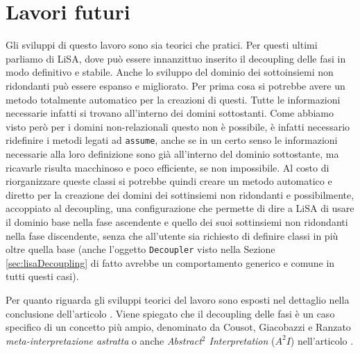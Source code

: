 \section{Lavori futuri}
Gli sviluppi di questo lavoro sono sia teorici che pratici. Per questi ultimi parliamo di LiSA, dove può essere innanzittuo inserito il decoupling delle fasi in modo definitivo e stabile. Anche lo sviluppo del dominio dei sottoinsiemi non ridondanti può essere espanso e migliorato. Per prima cosa si potrebbe avere un metodo totalmente automatico per la creazioni di questi. Tutte le informazioni necessarie infatti si trovano all'interno dei domini sottostanti. Come abbiamo visto però per i domini non-relazionali questo non è possibile, è infatti necessario ridefinire i metodi legati ad \texttt{assume}, anche se in un certo senso le informazioni necessarie alla loro definizione sono già all'interno del dominio sottostante, ma ricavarle risulta macchinoso e poco efficiente, se non impossibile. Al costo di riorganizzare queste classi si potrebbe quindi creare un metodo automatico e diretto per la creazione dei domini dei sottinsiemi non ridondanti e possibilmente, accoppiato al decoupling, una configurazione che permette di dire a LiSA di usare il dominio base nella fase ascendente e quello dei suoi sottinsiemi non ridondanti nella fase discendente, senza che all'utente sia richiesto di definire classi in più oltre quella base (anche l'oggetto \texttt{Decoupler} visto nella Sezione \ref{sec:lisaDecoupling} di fatto avrebbe un comportamento generico e comune in tutti questi casi). 

Per quanto riguarda gli sviluppi teorici del lavoro sono esposti nel dettaglio nella conclusione dell'articolo \cite{DBLP:conf/aplas/ArceriMZ22}. Viene spiegato che il decoupling delle fasi è un caso specifico di un concetto più ampio, denominato da Cousot, Giacobazzi e Ranzato \textit{meta-interpretazione astratta} o anche \textit{Abstract\(^2\) Interpretation} (\(A^2I\)) nell'articolo \cite{10.1145/3290355}. 